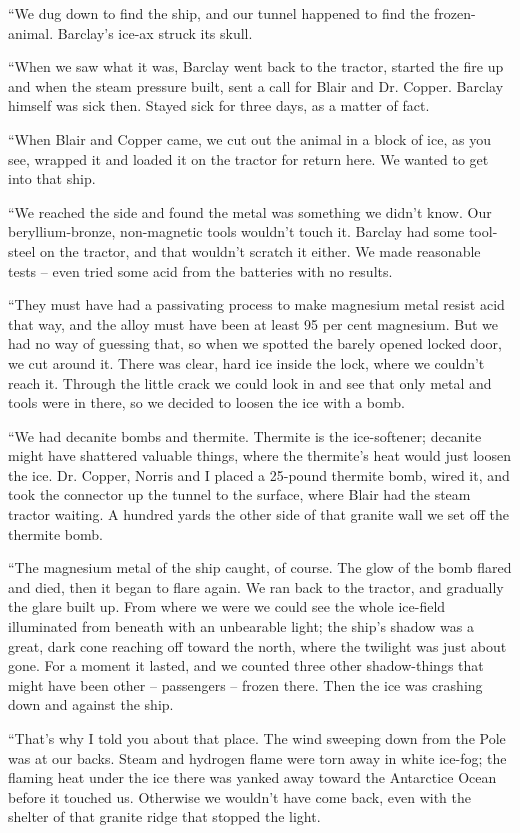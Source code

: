 \documentclass[letterpaper,openany,12pt]{memoir}		%
\begin{document}
``We dug down to find the ship, and our tunnel happened to find the
frozen-animal. Barclay's ice-ax struck its skull.

``When we saw what it was, Barclay went back to the tractor, started the fire up
and when the steam pressure built, sent a call for Blair and Dr. Copper. Barclay
himself was sick then. Stayed sick for three days, as a matter of fact.

``When Blair and Copper came, we cut out the animal in a block of ice, as you
see, wrapped it and loaded it on the tractor for return here. We wanted to get
into that ship.

``We reached the side and found the metal was something we didn't know. Our
beryllium-bronze, non-magnetic tools wouldn't touch it. Barclay had some
tool-steel on the tractor, and that wouldn't scratch it either. We made
reasonable tests -- even tried some acid from the batteries with no results.

``They must have had a passivating process to make magnesium metal resist acid
that way, and the alloy must have been at least 95 per cent magnesium. But we
had no way of guessing that, so when we spotted the barely opened locked door,
we cut around it. There was clear, hard ice inside the lock, where we couldn't
reach it. Through the little crack we could look in and see that only metal and
tools were in there, so we decided to loosen the ice with a bomb.

``We had decanite bombs and thermite. Thermite is the ice-softener; decanite
might have shattered valuable things, where the thermite's heat would just
loosen the ice. Dr. Copper, Norris and I placed a 25-pound thermite bomb, wired
it, and took the connector up the tunnel to the surface, where Blair had the
steam tractor waiting. A hundred yards the other side of that granite wall we
set off the thermite bomb.

``The magnesium metal of the ship caught, of course. The glow of the bomb flared
and died, then it began to flare again. We ran back to the tractor, and
gradually the glare built up. From where we were we could see the whole
ice-field illuminated from beneath with an unbearable light; the ship's shadow
was a great, dark cone reaching off toward the north, where the twilight was
just about gone. For a moment it lasted, and we counted three other
shadow-things that might have been other -- passengers -- frozen there. Then the
ice was crashing down and against the ship.

``That's why I told you about that place. The wind sweeping down from the Pole
was at our backs. Steam and hydrogen flame were torn away in white ice-fog; the
flaming heat under the ice there was yanked away toward the Antarctice Ocean
before it touched us. Otherwise we wouldn't have come back, even with the
shelter of that granite ridge that stopped the light.
\end{document}
